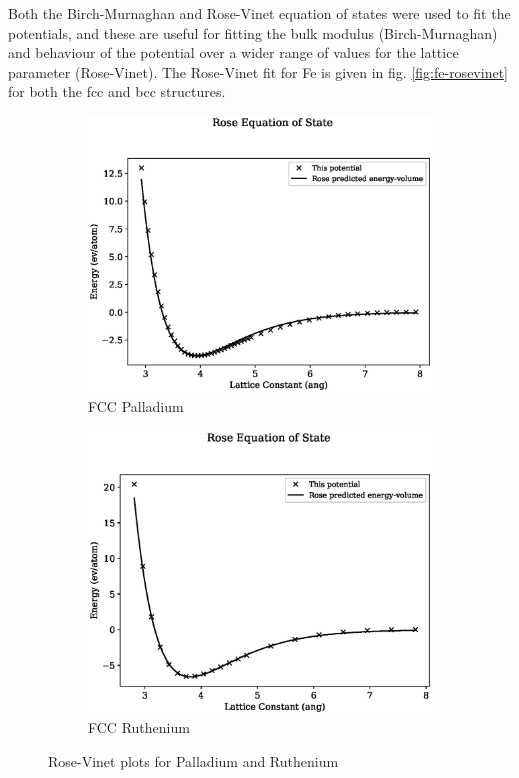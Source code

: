 Both the Birch-Murnaghan and Rose-Vinet equation of states were used to fit the potentials, and these are useful for fitting the bulk modulus (Birch-Murnaghan) and behaviour of the potential over a wider range of values for the lattice parameter (Rose-Vinet). The Rose-Vinet fit for Fe is given in fig. \ref{fig:fe-rosevinet} for both the \acrshort{fcc} and \acrshort{bcc} structures.

\begin{figure}[htb]
\begin{subfigure}{.48\textwidth}
  \centering
  \includegraphics[width=.94\linewidth]{chapters/potentials_fe_pd_ru/fepd_potential/eos/rose_plot_bp_2.eps}  
  \caption{FCC Palladium}
  \label{fig:rose-vinet-fcc-pd}
\end{subfigure}
\begin{subfigure}{.48\textwidth}
  \centering
  \includegraphics[width=.94\linewidth]{chapters/potentials_fe_pd_ru/feru_potential/eos/rose_plot_bp_2.eps}  
  \caption{FCC Ruthenium}
  \label{fig:rose-vinet-fcc-ru}
\end{subfigure}
\caption{Rose-Vinet plots for Palladium and Ruthenium}
\label{fig:rupd-rosevinet}
\end{figure}

